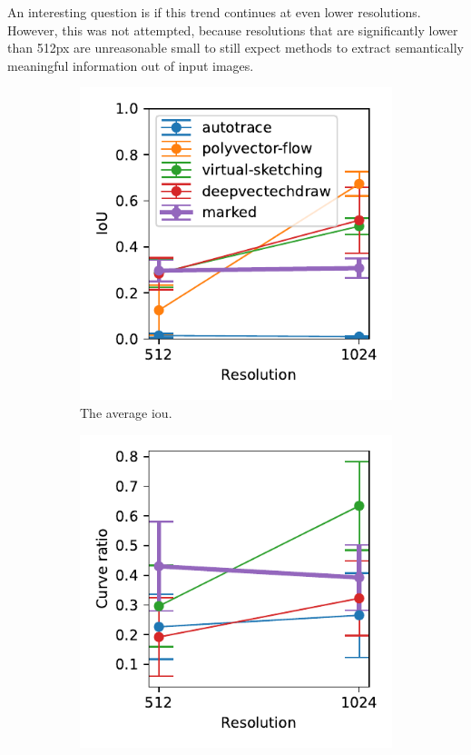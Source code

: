 An interesting question is if this trend continues at even lower resolutions. However, this was not attempted, because resolutions that are significantly lower than 512px are unreasonable small to still expect methods to extract semantically meaningful information out of input images.

\begin{figure}[h]
    \centering
    \begin{subfigure}{.3\textwidth}
    \centering
    \includegraphics[width=\textwidth]{graphics/eval/iou_res.pdf}
    \caption{The average \gls{iou}.}
    \label{fig:iou_res}
\end{subfigure}
    \begin{subfigure}{.3\textwidth}
    \centering
    \includegraphics[width=\textwidth]{graphics/eval/curve_ratio_res.pdf}

\end{subfigure}
\end{figure}

